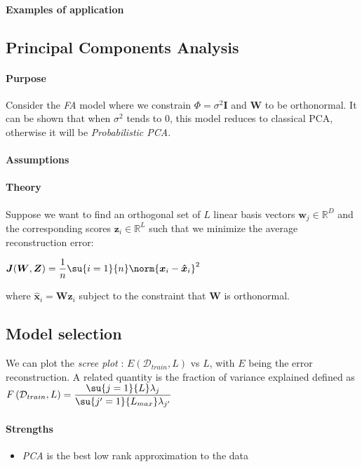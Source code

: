 \paragraph{Examples of application}

\subsection{Principal Components Analysis}
\paragraph{Purpose}
Consider the \emph{FA} model where we constrain $\Phi = \sigma^{2}\bm{I}$ and $\bm{W}$
to be orthonormal. It can be shown that when $\sigma^{2}$ tends to 0, this model 
reduces to classical PCA, otherwise it will be \emph{Probabilistic PCA}.
\paragraph{Assumptions}
\paragraph{Theory}
Suppose we want to find an orthogonal set of $L$ linear basis vectors $\bm{w}_{j}\in
\mathbb{R}^{D}$ and the corresponding scores $\bm{z}_{i}\in\mathbb{R}^{L}$ such that we
minimize the average reconstruction error:
\begin{center}
    $\bm{J}(\bm{W}, \bm{Z}) = \dfrac{1}{n}\su{i=1}{n}\norm{\bm{x}_{i} - 
    \bm{\hat{x}}_{i}}^{2}$
\end{center}
where $\bm{\hat{x}}_{i} = \bm{W}\bm{z}_{i}$ subject to the constraint that $\bm{W}$
is orthonormal. 
\subsection{Model selection}

We can plot the \emph{scree plot} : $E(\mathcal{D}_{train}, L)$ vs $L$, with $E$ being
the error reconstruction. 
A related quantity is the fraction of variance explained defined as $F\left(
\mathcal{D}_{train}, L\right) = \dfrac{\su{j=1}{L}\lambda_{j}}{\su{j'=1}{L_{max}}
\lambda_{j'}}$

\paragraph{Strengths}
\begin{itemize}
    \item \emph{PCA} is the best low rank approximation to the data
\end{itemize}

